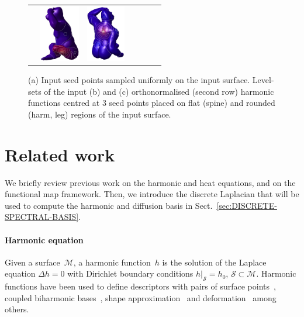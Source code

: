 \documentclass[acmtog,authorversion]{acmart}
\begin{document}
\begin{figure}[t]
\begin{tabular}{c|ccc|ccc}
&\includegraphics[height=70pt]{FMAP-images/monkey-harmonic-input-3-ORTH.jpg}
&\includegraphics[height=70pt]{FMAP-images/monkey-harmonic-input-4-ORTH.jpg}
\end{tabular}
\caption{(a) Input seed points sampled uniformly on the input surface. Level-sets of the input (b) and (c) orthonormalised (second row) harmonic functions centred at 3 seed points placed on flat (spine) and rounded (harm, leg) regions of the input surface.\label{fig:MONKEY-HARM}}
\end{figure}
%
\section{Related work\label{sec:RELATED-WORK}}
We briefly review previous work on the harmonic and heat equations, and on the functional map framework. Then, we introduce the discrete Laplacian that will be used to compute the harmonic and diffusion basis in Sect.~\ref{sec:DISCRETE-SPECTRAL-BASIS}.

\vspace{-0.5mm}
\paragraph*{Harmonic equation}
Given a surface~$\mathcal{M}$, a harmonic function~$h$ is the solution of the Laplace equation
\mbox{$\Delta h=0$} with Dirichlet boundary conditions \mbox{$h|_{\mathcal{S}}=h_{0}$},
\mbox{$\mathcal{S}\subset\mathcal{M}$}. Harmonic functions have been used to define descriptors with
pairs of surface points~\citep{ZHENG2013}, coupled biharmonic bases~\citep{KONVATSKY2013}, shape
approximation~\citep{FENG2012} and deformation~\citep{JOSHI2007,JACOBSON2014,WEBER2012} among others.

\vspace{-0.5mm}
\end{document}
